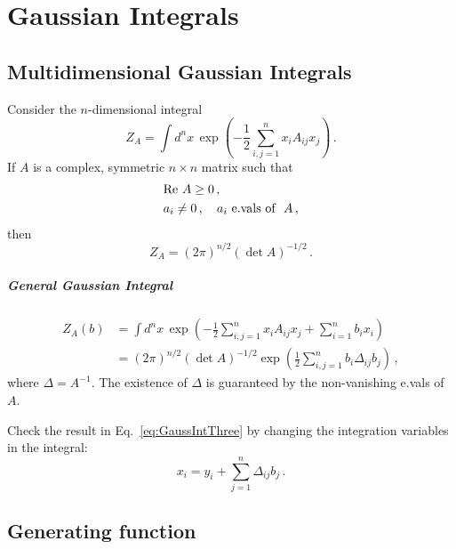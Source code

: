 \documentclass[notes.tex]{subfiles}
\begin{document}
\chapter{Gaussian Integrals}
\label{chap:lec0}

\section{Multidimensional Gaussian Integrals}
\label{sec:mult-gauss-integr}

Consider the $n$-dimensional integral
\begin{equation}
  \label{eq:GaussIntOne}
  Z_A = \int d^nx\, \exp\left(
    -\frac12 \sum_{i,j=1}^n x_i A_{ij} x_j
    \right)\, .
\end{equation}
If $A$ is a complex, symmetric $n\times n$ matrix such that
\begin{align}
  & \mathrm{Re}\ A \geq 0 \, ,\\
  & a_i \neq 0\, , \quad a_i\ \text{e.vals of }\ A\, ,
\end{align}
then 
\begin{equation}
  \label{eq:GaussIntTwo}
  Z_A = \left(2\pi\right)^{n/2} \left(\det A \right)^{-1/2}\, .
\end{equation}

\paragraph{General Gaussian Integral}

\begin{align}
  Z_A(b) &= \int d^nx\, \exp\left(
  -\frac12 \sum_{i,j=1}^n x_i A_{ij} x_j
  + \sum_{i=1}^n b_i x_i
  \right) \\
  \label{eq:GaussIntThree}
  &=  \left(2\pi\right)^{n/2} \left(\det A \right)^{-1/2}
    \exp\left(
  \frac12 \sum_{i,j=1}^n b_i \Delta_{ij} b_j
  \right) \, ,
\end{align}
where $\Delta = A^{-1}$. The existence of $\Delta$ is guaranteed by the non-vanishing e.vals of $A$.
\begin{Ex}
  Check the result in Eq.~\ref{eq:GaussIntThree} by changing the integration variables in the integral:
  \[
    x_i = y_i + \sum_{j=1}^n \Delta_{ij} b_j\, .
  \]
\end{Ex}

\section{Generating function}
\label{sec:generating-function}
\end{document}
